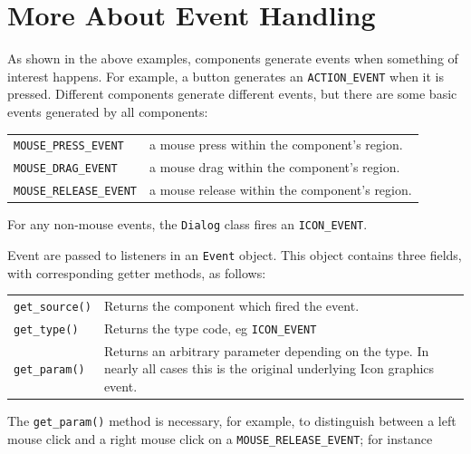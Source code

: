 \section{More About Event Handling}

As shown in the above examples, components generate events when
something of interest happens. For example, a button generates an
\texttt{ACTION\_EVENT} when it is pressed. Different components
generate different events, but there are some basic events generated by
all components:

\vspace{0.15in}
\begin{supertabular}{m{2.2in} m{3.5in}}
\texttt{MOUSE\_PRESS\_EVENT} &
 a mouse press within the component's
region.\\
\texttt{MOUSE\_DRAG\_EVENT} &
 a mouse drag within the component's
region.\\
\texttt{MOUSE\_RELEASE\_EVENT} &
 a mouse release within the component's
region.\\
\end{supertabular}
\vspace{0.15in}

\noindent For any non-mouse events, the \texttt{Dialog} class fires an
\texttt{ICON\_EVENT}.

Event are passed to listeners in an \texttt{Event}
object. This object contains three fields,
with corresponding getter methods, as follows:

\vspace{0.15in}
\begin{supertabular}{m{1.2in} m{4.7in}}
\texttt{get\_source()} & Returns the component which fired the event.\\
\texttt{get\_type()} & Returns the type code, eg \texttt{ICON\_EVENT}\\
\texttt{get\_param()} &
Returns an arbitrary parameter depending on the type. In
nearly all cases this is the original underlying Icon graphics event.\\
\end{supertabular}
\vspace{0.15in}

The \texttt{get\_param()} method is necessary, for example, to
distinguish between a left mouse click and a right mouse click on a
\texttt{MOUSE\_RELEASE\_EVENT}; for instance 


